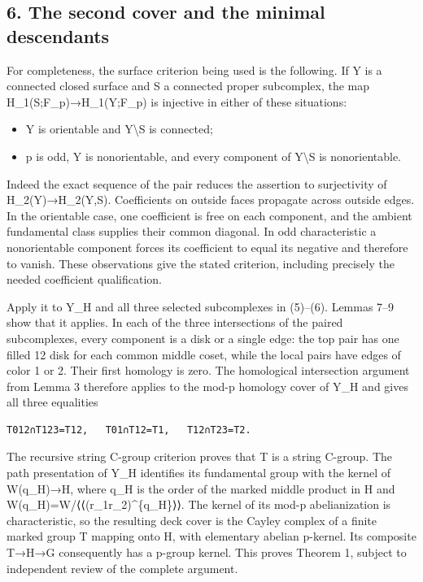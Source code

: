 \documentclass[
  11pt,
  a4paper,
]{article}
\providecommand{\tightlist}{%
  \setlength{\itemsep}{0pt}\setlength{\parskip}{0pt}}
\begin{document}
\subsection{6. The second cover and the minimal
descendants}\label{the-second-cover-and-the-minimal-descendants}

For completeness, the surface criterion being used is the following. If
Y is a connected closed surface and S a connected proper subcomplex, the
map H\_1(S;F\_p)→H\_1(Y;F\_p) is injective in either of these
situations:

\begin{itemize}
\tightlist
\item
  Y is orientable and Y\textbackslash S is connected;
\item
  p is odd, Y is nonorientable, and every component of Y\textbackslash S
  is nonorientable.
\end{itemize}

Indeed the exact sequence of the pair reduces the assertion to
surjectivity of H\_2(Y)→H\_2(Y,S). Coefficients on outside faces
propagate across outside edges. In the orientable case, one coefficient
is free on each component, and the ambient fundamental class supplies
their common diagonal. In odd characteristic a nonorientable component
forces its coefficient to equal its negative and therefore to vanish.
These observations give the stated criterion, including precisely the
needed coefficient qualification.

Apply it to Y\_H and all three selected subcomplexes in (5)--(6). Lemmas
7--9 show that it applies. In each of the three intersections of the
paired subcomplexes, every component is a disk or a single edge: the top
pair has one filled 12 disk for each common middle coset, while the
local pairs have edges of color 1 or 2. Their first homology is zero.
The homological intersection argument from Lemma 3 therefore applies to
the mod-p homology cover of Y\_H and gives all three equalities

\begin{verbatim}
T012∩T123=T12,   T01∩T12=T1,   T12∩T23=T2.
\end{verbatim}

The recursive string C-group criterion proves that T is a string
C-group. The path presentation of Y\_H identifies its fundamental group
with the kernel of W(q\_H)→H, where q\_H is the order of the marked
middle product in H and W(q\_H)=W/⟨⟨(r\_1r\_2)\^{}\{q\_H\}⟩⟩. The kernel
of its mod-p abelianization is characteristic, so the resulting deck
cover is the Cayley complex of a finite marked group T mapping onto H,
with elementary abelian p-kernel. Its composite T→H→G consequently has a
p-group kernel. This proves Theorem 1, subject to independent review of
the complete argument.
\end{document}
